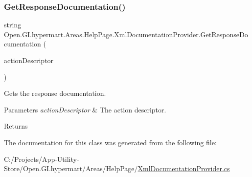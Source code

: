 \subsubsection{\texorpdfstring{Get\+Response\+Documentation()}{GetResponseDocumentation()}}
{\footnotesize\ttfamily string Open.\+G\+I.\+hypermart.\+Areas.\+Help\+Page.\+Xml\+Documentation\+Provider.\+Get\+Response\+Documentation (\begin{DoxyParamCaption}\item[{Http\+Action\+Descriptor}]{action\+Descriptor }\end{DoxyParamCaption})}



Gets the response documentation. 


\begin{DoxyParams}{Parameters}
{\em action\+Descriptor} & The action descriptor.\\
\hline
\end{DoxyParams}
\begin{DoxyReturn}{Returns}

\end{DoxyReturn}


The documentation for this class was generated from the following file\+:\begin{DoxyCompactItemize}
\item 
C\+:/\+Projects/\+App-\/\+Utility-\/\+Store/\+Open.\+G\+I.\+hypermart/\+Areas/\+Help\+Page/\hyperlink{_xml_documentation_provider_8cs}{Xml\+Documentation\+Provider.\+cs}\end{DoxyCompactItemize}
